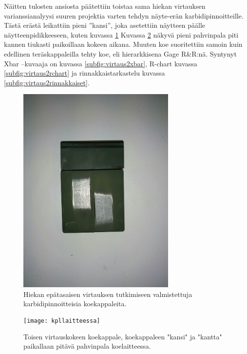 \documentclass[12pt,a4paper,finnish]{tutthesis}
\begin{document}
Näitten tulosten ansiosta päätettiin toistaa sama hiekan virtauksen varianssianalyysi suuren projektia varten tehdyn näyte-erän karbidipinnoitteille. Tästä erästä leikattiin pieni ”kansi”, joka asetettiin näytteen päälle näytteenpidikkeeseen, kuten kuvassa \ref{fig:kappaleet2}
Kuvassa \ref{fig:kpllaitteessa} näkyvä pieni pahvinpala piti kannen tiukasti paikoillaan kokeen aikana.
Muuten koe suoritettiin samoin kuin edellinen teräskappaleilla tehty koe,
eli hierarkkisena Gage R\&R:nä.
Syntynyt Xbar –kuvaaja on kuvassa \ref{subfig:virtaus2xbar}, R-chart kuvassa \ref{subfig:virtaus2rchart} ja rinnakkaistarkastelu
kuvassa \ref{subfig:virtaus2rinnakkaiset}.

\begin{figure}
  \begin{center}
    \includegraphics[width=0.7\textwidth]{kappaleet2}
  \end{center}
  \caption[Toisen virtauskokeen koekappaleita]{Hiekan epätasaisen virtauksen tutkimiseen valmistettuja karbidipinnoitteisia koekappaleita.}
  \label{fig:kappaleet2}
\end{figure}

\begin{figure}
  \begin{center}
    \texttt{[image: kpllaitteessa]}
  \end{center}
  \caption[Toisen virtauskokeen koejärjestely]{Toisen virtauskokeen koekappale, koekappaleen "kansi" ja "kantta" paikallaan pitävä pahvinpala koelaitteessa.}
  \label{fig:kpllaitteessa}
\end{figure}
\end{document}
